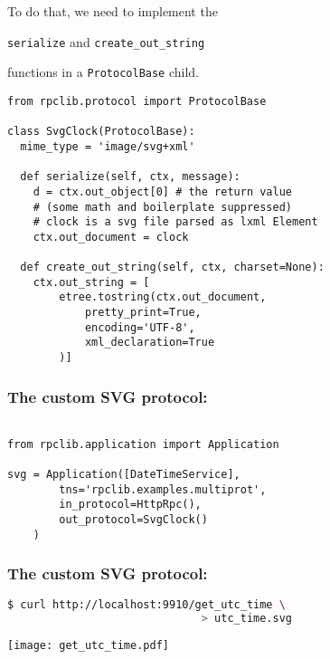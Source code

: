\documentclass{beamer}
\begin{document}
\begin{frame}
  \LARGE
  \begin{center}
    To do that, we need to implement the

    \bigskip

    \texttt{serialize} and \texttt{create\_out\_string}

    \bigskip

    functions in a \texttt{ProtocolBase} child.
  \end{center}
\end{frame}

\begin{frame}[fragile]
  \small
  \begin{lstlisting}
from rpclib.protocol import ProtocolBase

class SvgClock(ProtocolBase):
  mime_type = 'image/svg+xml'

  def serialize(self, ctx, message):
    d = ctx.out_object[0] # the return value
    # (some math and boilerplate suppressed)
    # clock is a svg file parsed as lxml Element
    ctx.out_document = clock

  def create_out_string(self, ctx, charset=None):
    ctx.out_string = [
        etree.tostring(ctx.out_document,
            pretty_print=True,
            encoding='UTF-8',
            xml_declaration=True
        )]
  \end{lstlisting}
\end{frame}

\begin{frame}[fragile]
\frametitle{The custom SVG protocol:}
\begin{lstlisting}

from rpclib.application import Application

svg = Application([DateTimeService],
        tns='rpclib.examples.multiprot',
        in_protocol=HttpRpc(),
        out_protocol=SvgClock()
    )

\end{lstlisting}

\end{frame}

\begin{frame}[fragile]
\frametitle{The custom SVG protocol:}

  \begin{lstlisting}[language=sh]
$ curl http://localhost:9910/get_utc_time \
                              > utc_time.svg
  \end{lstlisting}

  \begin{center}
    \texttt{[image: get\_utc\_time.pdf]}
  \end{center}
\end{frame}
\end{document}
